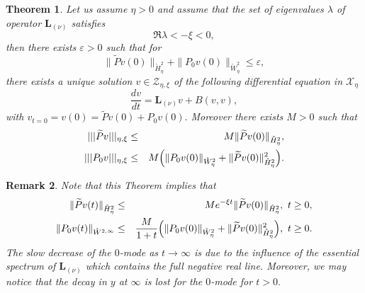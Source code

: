 \documentclass[11pt]{article}
\newtheorem{theorem}{Theorem}
\newtheorem{remark}[theorem]{Remark}
\begin{document}
\begin{theorem} \label{maintheo1}
\label{Lem:stabnonlin}
Let us assume $\eta > 0$ and assume that the set of
eigenvalues $\lambda $ of operator $\boldsymbol{L}_{(\nu )}$ satisfies%
\begin{equation*}
\Re \lambda <-\xi  <0,
\end{equation*}%
then there exists $\varepsilon >0$ such that for 
\begin{equation*}
\|\widetilde{P}v(0)\|_{\mathring{H}_{\eta}^{2}} + \|P_{0}v(0)\|_{\mathring{W}_{\eta}^{2}}\leq \varepsilon ,
\end{equation*}
there exists a unique solution $v\in \mathcal{Z}_{\eta,\xi }$ of the following
differential equation in $\mathcal{X}_{\eta}$%
\begin{equation}
\frac{dv}{dt}=\boldsymbol{L}_{(\nu )}v+B(v,v),  \label{equ diff basic}
\end{equation}%
with $v_{t=0}=v(0)=\widetilde{P}v(0)+P_{0}v(0).$ Moreover there exists $M>0$
such that%
\begin{eqnarray*}
|||\widetilde{P}v|||_{\eta,\xi  } &\leq &M\|\widetilde{P}v(0)\|_{\mathring{H}%
_{\eta}^{2}}, \\
|||P_{0}v|||_{\eta,\xi  } &\leq &M \Bigl( \|P_{0}v(0)\|_{\mathring{W}_{\eta}^{2}}+\|%
\widetilde{P}v(0)\|_{\mathring{H}_{\eta}^{2}}^{2} \Bigr).
\end{eqnarray*}
\end{theorem}

\begin{remark}
Note that this Theorem implies that 
\begin{eqnarray*}
\|\widetilde{P}v(t)\|_{\mathring{H}_{\eta}^{2}} &\leq &Me^{-\xi t}\|%
\widetilde{P}v(0)\|_{\mathring{H}_{\eta}^{2}},\text{ }t\geq 0, \\
\|P_{0}v(t)\|_{\mathring{W}^{2,\infty }} &\leq &\frac{M}{1+t}%
\Bigl( \|P_{0}v(0)\|_{\mathring{W}_{\eta}^{2}}+\|\widetilde{P}v(0)\|_{\mathring{H}%
_{\eta}^{2}}^{2} \Bigr),\text{ }t\geq 0.
\end{eqnarray*}%
The slow decrease of the $0$-mode as $t\rightarrow \infty $ is due to the
influence of the essential spectrum of $\boldsymbol{L}_{(\nu )}$ which contains
the full negative real line. Moreover, we may notice that the decay in $y$
at $\infty $ is lost for the $0$-mode for $t>0.$
\end{remark}
\end{document}
